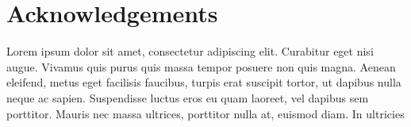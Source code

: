 \documentclass[a4paper,fleqn,usenatbib]{mnras}
\begin{document}
\section*{Acknowledgements}

Lorem ipsum dolor sit amet, consectetur adipiscing elit. Curabitur
eget nisi augue. Vivamus quis purus quis massa tempor posuere non quis
magna. Aenean eleifend, metus eget facilisis faucibus, turpis erat
suscipit tortor, ut dapibus nulla neque ac sapien. Suspendisse luctus
eros eu quam laoreet, vel dapibus sem porttitor. Mauris nec massa
ultrices, porttitor nulla at, euismod diam. In ultricies




\bsp
\label{lastpage}
\end{document}
